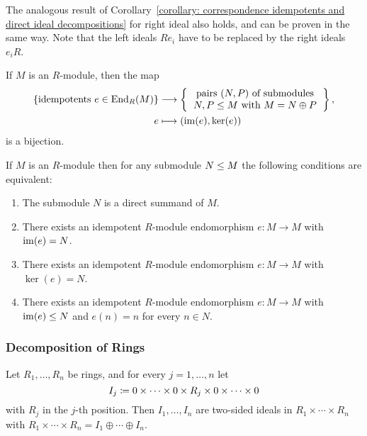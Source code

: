 \begin{remark}
  The analogous result of Corollary~\ref{corollary: correspondence idempotents and direct ideal decompositions} for right ideal also holds, and can be proven in the same way.
  Note that the left ideals $R e_i$ have to be replaced by the right ideals $e_i R$.
\end{remark}


\begin{corollary}
  If $M$ is an $R$-module, then the map
  \begin{align*}
    \{ \text{idempotents $e \in \End_R(M)$} \}
    &\longto
      \left\{
      \begin{tabular}{c}
        pairs $(N,P)$ of submodules \\
        $N, P \moduleeq M$ with $M = N \oplus P$
      \end{tabular}
      \right\},
    \\
                  e
    &\longmapsto  (\im(e), \ker(e))
  \end{align*}
  is a bijection.
\end{corollary}


\begin{corollary}
  If $M$ is an $R$-module then for any submodule $N \leq M$ the following conditions are equivalent:
  \begin{enumerate}
    \item
      The submodule $N$ is a direct summand of $M$.
    \item
      There exists an idempotent $R$-module endomorphism $e \colon M \to M$ with $\operatorname{im}(e) = N$.
    \item
      There exists an idempotent $R$-module endomorphism $e \colon M \to M$ with $\ker(e) = N$.
    \item
      There exists an idempotent $R$-module endomorphism $e \colon M \to M$ with $\operatorname{im}(e) \leq N$ and $e(n) = n$ for every $n \in N$.
  \end{enumerate}
\end{corollary}



\subsubsection{Decomposition of Rings}


\begin{lemma}
  Let $R_1, \dotsc, R_n$ be rings, and for every $j = 1, \dotsc, n$ let
  \[
              I_j
    \coloneqq  0 \times \dotsb \times 0 \times R_j \times 0 \times \dotsb \times 0
  \]
  with $R_j$ in the $j$-th position.
  Then $I_1, \dotsc, I_n$ are two-sided ideals in $R_1 \times \dotsb \times R_n$ with $R_1 \times \dotsb \times R_n = I_1 \oplus \dotsb \oplus I_n$.
\end{lemma}


